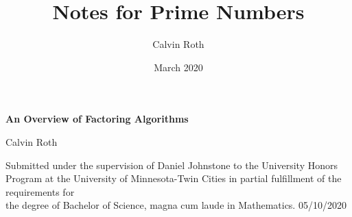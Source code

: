 \documentclass{article}
\title{Notes for Prime Numbers}
\author{Calvin Roth}
\date{March 2020}
\begin{document}
\newtheorem{theorem}{Theorem}[section]
\newtheorem{lem}{Lemma}[section]
\newtheorem{claim}[lem]{Claim}
\newtheorem{example}{Example}[section]
\newcommand{\prob}[1]{\section{} \noindent \textbf{Statement} #1 $ $\\ \textbf{Solution} $ $\\ }
\newcommand{\soln}{\noindent \textbf{Solution} $ $\\ }
\newcommand{\sol}{\noindent \textbf{Solution} $ $}
  \npthousandsep{ }

\newcommand{\IC}[1]{\noindent \textbf{Inductive Case} #1 $ $ \\}
\newcommand{\BC}[1]{\noindent \textbf{Base Case} #1 $ $ \\}

\newcommand{\inner}[1]{\langle #1 | #1\rangle}

\newcommand{\R}{\mathbb{R}}
\newcommand{\Z}{\mathbb{Z}}
\newcommand{\N}{\mathbb{N}}
\newcommand{\C}{\mathbb{C}}
\newcommand{\Q}{\mathbb{Q}}
\newcommand{\Zm}[1]{\Z / #1 \Z}
\newcommand{\bR}{$\mathbb{R}$ }
\newcommand{\bN}{$\mathbb{N}$ }
\newcommand{\bZ}{$\mathbb{Z}$ }
\newcommand{\bC}{$\mathbb{C}$ }
\newcommand{\bQ}{$\mathbb{Q}$ }
\newcommand{\softO}[1]{\tilde{O}(#1)}
\newcommand{\sftO}[1]{\tilde{O}(#1)}
\newcommand{\curve}[1]{C($\#1$)}

\newcommand{\set}[1]{\{#1\}}
\newcommand{\setc}[2]{\{$#1$ : $#2$\}}
\newcommand{\term}[2]{\textbf{Definition} \textit{#1} #2 $ $ \\}
\makeatletter
\makeatother

\begin{titlepage}
    \begin{center}
        \vspace*{5cm}
            
        \Large
        \textbf{An Overview of Factoring Algorithms}
            
        \vspace{0.5cm}
            
        \large  
        Calvin Roth
            
        \vspace{2.0cm}
        \normalsize  
Submitted under the supervision of Daniel Johnstone to the University Honors \\
Program at the University of Minnesota-Twin Cities in partial fulfillment of the requirements for\\
the degree of Bachelor of Science, magna cum laude in Mathematics.
        \vfill 
        05/10/2020
        \vspace{2cm}
    \end{center}
\end{titlepage}
\end{document}
